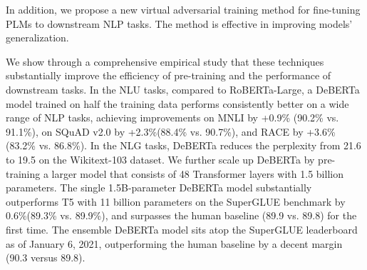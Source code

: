 In addition, we propose a new virtual adversarial training method for fine-tuning PLMs to downstream NLP tasks. The method is effective in improving models’ generalization.


We show through a comprehensive empirical study that these techniques substantially improve the efficiency of pre-training and the performance of downstream tasks. 
In the NLU tasks, compared to RoBERTa-Large, a DeBERTa model trained on half the training data performs consistently better on a wide range of NLP tasks, 
achieving improvements on MNLI by +0.9\% (90.2\% vs. 91.1\%), on SQuAD v2.0 by +2.3\%(88.4\% vs. 90.7\%), and RACE by +3.6\% (83.2\% vs. 86.8\%). 
In the NLG tasks, DeBERTa reduces the perplexity from 21.6 to 19.5 on the Wikitext-103 dataset. 
We further scale up DeBERTa by pre-training a larger model that consists of 48 Transformer layers with 1.5 billion parameters. 
The single 1.5B-parameter DeBERTa model substantially outperforms T5 with 11 billion parameters on the SuperGLUE benchmark \citep{wang2019superglue} by 0.6\%(89.3\% vs. 89.9\%), and surpasses the human baseline (89.9 vs. 89.8) for the first time.
The ensemble DeBERTa model sits atop the SuperGLUE leaderboard as of January 6, 2021, outperforming the human baseline by a decent margin (90.3 versus 89.8). 
 

